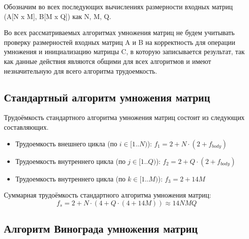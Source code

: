 Обозначим во всех последующих вычислениях размерности входных матриц (A[N x M], B[M x Q]) как N, M, Q.

Во всех рассматриваемых алгоритмах умножения матриц не будем учитывать проверку размерностей входных матриц A и B на корректность для операции умножения и инициализацию матрицы C, в которую записывается результат, так как данные действия являются общими для всех алгоритмов и имеют незначительную для всего алгоритма трудоемкость.

\subsection{Стандартный алгоритм умножения матриц}

Трудоёмкость стандартного алгоритма умножения матриц состоит из следующих составляющих.
\begin{itemize}
	\item Трудоемкость внешнего цикла (по $i \in [1..N)$): $f_1 = 2 + N \cdot (2 + f_{body})$
	\item Трудоемкость внутреннего цикла (по $j \in [1..Q)$): $f_2 = 2 + Q \cdot (2 + f_{body})$
	\item Трудоемкость внутреннего цикла (по $k \in [1..M)$): $f_3  = 2 + 14M$
\end{itemize}

Суммарная трудоёмкость стандартного алгоритма умножения матриц:
\begin{equation}
	\label{for:standard}
	f_{s} = 2 + N \cdot (4 + Q \cdot (4 + 14M)) \approx 14NMQ
\end{equation}

\subsection{Алгоритм Винограда умножения матриц}

